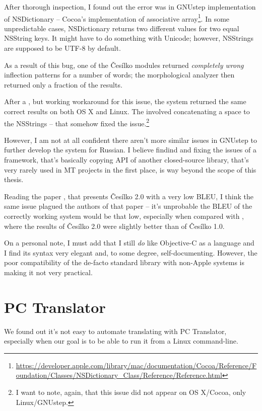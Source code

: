 After thorough inspection, I found out the error was in GNUstep implementation of NSDictionary -- Cocoa's implementation of associative array\footnote{\url{https://developer.apple.com/library/mac/documentation/Cocoa/Reference/Foundation/Classes/NSDictionary\_Class/Reference/Reference.html}}. In some unpredictable cases, NSDictionary returns two different values for two equal NSString keys. It might have to do something with Unicode; however, NSStrings are supposed to be UTF-8 by default.

As a result of this bug, one of the Česílko modules returned \emph{completely wrong} inflection patterns for a number of words; the morphological analyzer then returned only a fraction of the results.

After a , but working workaround for this issue, the system returned the same correct results on both OS X and Linux. The  involved concatenating a space to the NSStrings -- that somehow fixed the issue.\footnote{I want to note, again, that this issue did not appear on OS X/Cocoa, only Linux/GNUstep.} 

However, I am not at all confident there aren't more similar issues in GNUstep to further develop the system for Russian.
I believe findind and fixing the issues of a framework, that's basically copying API of another closed-source library, that's very rarely used in MT projects in the first place, is way beyond the scope of this thesis.


Reading the paper \cite{evalquality_cesilko}, that presents Česílko 2.0 with a very low BLEU, I think the same issue plagued the authors of that paper -- it's unprobable the BLEU of the correctly working system would be that low, especially when compared with \cite{cesilko2}, where the results of Česílko 2.0 were slightly better than of Česílko 1.0.

On a personal note, I must add that I still \emph{do} like Objective-C as a language and I find its syntax very elegant and, to some degree, self-documenting. However, the poor compatibility of the de-facto standard library with non-Apple systems is making it not very practical.

\section{PC Translator}
We found out it's not easy to automate translating with PC Translator, especially when our goal is to be able to run it from a Linux command-line.

